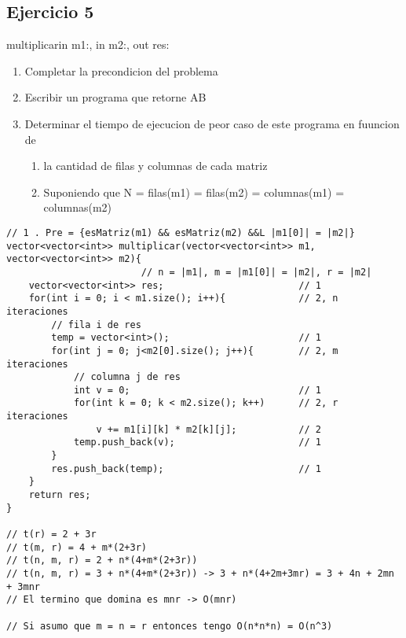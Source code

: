 \documentclass{article}
\begin{document}
\subsection{Ejercicio 5}

\begin{proc}{multiplicar}{in m1:\matriz{\ent}, in m2:\matriz{\ent}, out res:\matriz{\ent}}{}
    \pre{\dots}
\end{proc}

\begin{enumerate}
    \item Completar la precondicion del problema
    \item Escribir un programa que retorne AB
    \item Determinar el tiempo de ejecucion de peor caso de este programa en fuuncion de 
    \begin{enumerate}
        \item la cantidad de filas y columnas de cada matriz
        \item Suponiendo que N = filas(m1) = filas(m2) = columnas(m1) = columnas(m2)
    \end{enumerate}
\end{enumerate}

\begin{lstlisting}
// 1 . Pre = {esMatriz(m1) && esMatriz(m2) &&L |m1[0]| = |m2|}
vector<vector<int>> multiplicar(vector<vector<int>> m1, vector<vector<int>> m2){
                        // n = |m1|, m = |m1[0]| = |m2|, r = |m2|
    vector<vector<int>> res;                        // 1
    for(int i = 0; i < m1.size(); i++){             // 2, n iteraciones
        // fila i de res
        temp = vector<int>();                       // 1
        for(int j = 0; j<m2[0].size(); j++){        // 2, m iteraciones
            // columna j de res
            int v = 0;                              // 1
            for(int k = 0; k < m2.size(); k++)      // 2, r iteraciones
                v += m1[i][k] * m2[k][j];           // 2
            temp.push_back(v);                      // 1
        }
        res.push_back(temp);                        // 1
    }
    return res;
}

// t(r) = 2 + 3r
// t(m, r) = 4 + m*(2+3r)
// t(n, m, r) = 2 + n*(4+m*(2+3r))
// t(n, m, r) = 3 + n*(4+m*(2+3r)) -> 3 + n*(4+2m+3mr) = 3 + 4n + 2mn + 3mnr
// El termino que domina es mnr -> O(mnr)

// Si asumo que m = n = r entonces tengo O(n*n*n) = O(n^3)
\end{lstlisting}

\pagebreak
\end{document}
